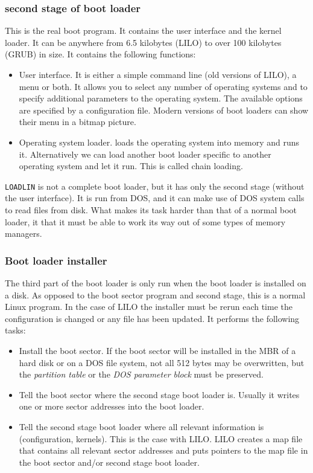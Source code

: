 \documentclass[12pt,a4paper]{article}
\begin{document}
\subsubsection{second stage of boot loader}

This is the real boot program. It contains the user interface and the
kernel loader. It can be anywhere from 6.5 kilobytes (LILO) to
over 100 kilobytes (GRUB) in size. It contains the following functions:
\begin{itemize}
\item User interface. It is either a simple command line (old versions
  of LILO), a menu or both. It allows you to select any number of
  operating systems and to specify additional parameters to the
  operating system. The available options are specified by a
  configuration file. Modern versions of boot loaders can show their
  menu in a bitmap picture.
\item Operating system loader. loads the operating system into memory
  and runs it. Alternatively we can load another boot loader specific
  to another operating system and let it run. This is called chain
  loading. 
\end{itemize}

{\tt LOADLIN} is not a complete boot loader, but it has only the
second stage (without the user interface). It is run from DOS, and it
can make use of DOS system calls to read files from disk. What makes
its task harder than that of a normal boot loader, it that it must be
able to work its way out of some types of memory managers.

\subsubsection{Boot loader installer}

The third part of the boot loader is only run when the boot loader is
installed on a disk. As opposed to the boot sector program and second
stage, this is a normal Linux program. In the case of LILO the
installer must be rerun each time the configuration is changed or any
file has been updated. It performs the following tasks:
\begin{itemize}
\item Install the boot sector. If the boot sector will be installed in
  the MBR of a hard disk or on a DOS file system, not all 512 bytes
  may be overwritten, but the {\em partition table} or the {\em DOS
  parameter block} must be preserved.
\item Tell the boot sector where the second stage boot loader
  is. Usually it writes one or more sector addresses into the boot loader.
\item Tell the second stage boot loader where all relevant information
  is (configuration, kernels). This is the case with LILO. LILO
  creates a map file that contains all relevant sector addresses and
  puts pointers to the map file in the boot sector and/or second stage
  boot loader.
\end{itemize}
\end{document}
